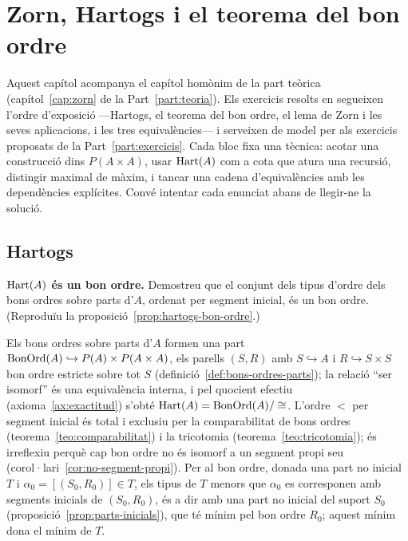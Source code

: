 \chapter{Zorn, Hartogs i el teorema del bon ordre}\label{cap:practica-zorn}

Aquest capítol acompanya el capítol homònim de la part teòrica (capítol~\ref{cap:zorn} de la Part~\ref{part:teoria}). Els exercicis resolts en segueixen l'ordre d'exposició ---Hartogs, el teorema del bon ordre, el lema de Zorn i les seves aplicacions, i les tres equivalències--- i serveixen de model per als exercicis proposats de la Part~\ref{part:exercicis}. Cada bloc fixa una tècnica: acotar una construcció dins \(P(A\times A)\), usar \(\operatorname{Hart}(A)\) com a cota que atura una recursió, distingir maximal de màxim, i tancar una cadena d'equivalències amb les dependències explícites. Convé intentar cada enunciat abans de llegir-ne la solució.

\section{Hartogs}\label{prac:hartogs}

\begin{exercici}
\textbf{\(\operatorname{Hart}(A)\) és un bon ordre.} Demostreu que el conjunt dels tipus d'ordre dels bons ordres sobre parts d'\(A\), ordenat per segment inicial, és un bon ordre. (Reproduïu la proposició~\ref{prop:hartogs-bon-ordre}.)
\end{exercici}
\begin{solucio}
Els bons ordres sobre parts d'\(A\) formen una part \(\operatorname{BonOrd}(A)\hookrightarrow P(A)\times P(A\times A)\), els parells \((S,R)\) amb \(S\hookrightarrow A\) i \(R\hookrightarrow S\times S\) bon ordre estricte sobre tot \(S\) (definició~\ref{def:bons-ordres-parts}); la relació \enquote{ser isomorf} és una equivalència interna, i pel quocient efectiu (axioma~\ref{ax:exactitud}) s'obté \(\operatorname{Hart}(A)=\operatorname{BonOrd}(A)/\cong\). L'ordre \(<\) per segment inicial és total i exclusiu per la comparabilitat de bons ordres (teorema~\ref{teo:comparabilitat}) i la tricotomia (teorema~\ref{teo:tricotomia}); és irreflexiu perquè cap bon ordre no és isomorf a un segment propi seu (corol·lari~\ref{cor:no-segment-propi}). Per al bon ordre, donada una part no inicial \(T\) i \(\alpha_0=[(S_0,R_0)]\in T\), els tipus de \(T\) menors que \(\alpha_0\) es corresponen amb segments inicials de \((S_0,R_0)\), és a dir amb una part no inicial del suport \(S_0\) (proposició~\ref{prop:parts-inicials}), que té mínim pel bon ordre \(R_0\); aquest mínim dona el mínim de \(T\).
\end{solucio}

